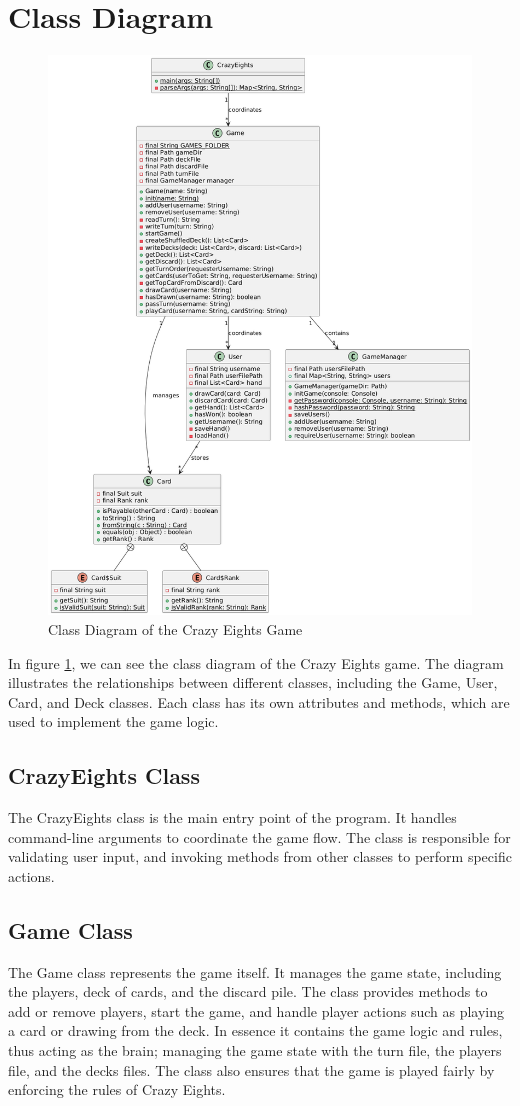 \documentclass[conference]{IEEEtran}
\begin{document}
\section{Class Diagram}
\begin{figure}[H]
    \centering
    \includegraphics[width=0.8\linewidth]{class/diagram.png}
    \caption{Class Diagram of the Crazy Eights Game}
    \label{fig:class_diagram}
\end{figure}

In figure \ref{fig:class_diagram}, we can see the class diagram of the Crazy Eights game. The diagram illustrates the relationships between different classes, including the Game, User, Card, and Deck classes. Each class has its own attributes and methods, which are used to implement the game logic.

\subsection{CrazyEights Class}
The CrazyEights class is the main entry point of the program. It handles command-line arguments to coordinate the game flow. The class is responsible for validating user input, and invoking methods from other classes to perform specific actions.

\subsection{Game Class}
The Game class represents the game itself. It manages the game state, including the players, deck of cards, and the discard pile. The class provides methods to add or remove players, start the game, and handle player actions such as playing a card or drawing from the deck. In essence it contains the game logic and rules, thus acting as the brain; managing the game state with the turn file, the players file, and the decks files. The class also ensures that the game is played fairly by enforcing the rules of Crazy Eights.
\end{document}
